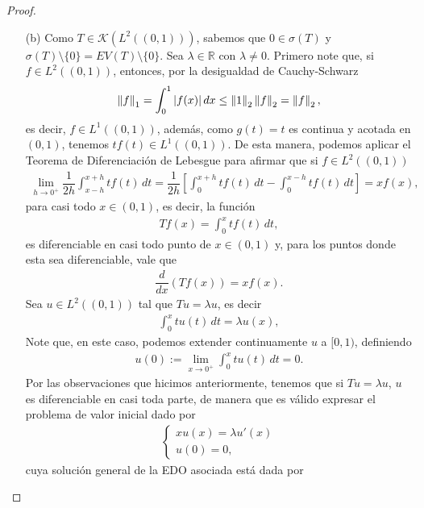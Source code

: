 \begin{proof}
\begin{enumerate}
        \item[(b)] Como $T\in \mathcal{K}(L^2((0,1)))$, sabemos que $0 \in \sigma(T)$ y $\sigma(T)\setminus\{0\}=EV(T)\setminus\{0\}$. Sea $\lambda \in \mathbb{R}$ con $\lambda\neq 0$. Primero note que, si $f \in L^2((0,1))$, entonces, por la desigualdad de Cauchy-Schwarz
        \begin{align*}
            \left\|f\right\|_1=\int_0^1 |f(x)|\, dx\leq \left\|1\right\|_2\left\|f\right\|_2=\left\|f\right\|_2,
        \end{align*}
        es decir, $f \in L^1((0,1))$, además, como $g(t)=t$ es continua y acotada en $(0,1)$, tenemos $tf(t)\in L^1((0,1))$. De esta manera, podemos aplicar el Teorema de Diferenciación de Lebesgue para afirmar que si $f \in L^2((0,1))$
        \begin{align*}
            \lim_{h\to 0^+}\dfrac{1}{2h}\int_{x-h}^{x+h} tf(t)\, dt=\dfrac{1}{2h}\left[\int_{0}^{x+h}tf(t)\, dt-\int_0^{x-h}tf(t)\, dt\right]=xf(x),
        \end{align*}
        para casi todo $x \in (0,1)$, es decir, la función 
        \begin{align*}
            Tf(x)=\int_{0}^x tf(t)\, dt,
        \end{align*}
        es diferenciable en casi todo punto de $x \in (0,1)$ y, para los puntos donde esta sea diferenciable, vale que
        \begin{align*}
            \dfrac{d}{dx}(Tf(x))=xf(x).
        \end{align*}
        Sea $u \in L^2((0,1))$ tal que $Tu=\lambda u$, es decir
        \begin{align*}
            \int_0^x tu(t)\, dt=\lambda u(x),
        \end{align*}
        Note que, en este caso, podemos extender continuamente $u$ a $[0,1)$, definiendo
        \begin{align*}
            u(0):=\lim_{x\to 0^+}\int_0^x tu(t)\, dt=0.
        \end{align*}
        Por las observaciones que hicimos anteriormente, tenemos que si $Tu=\lambda u$, $u$ es diferenciable en casi toda parte, de manera que es válido expresar el problema de valor inicial dado por
        \begin{align*}
            \begin{cases}
                xu(x)=\lambda u'(x)\\
                u(0)=0,
            \end{cases}
        \end{align*}
        cuya solución general de la EDO asociada está dada por

\end{enumerate}
\end{proof}

